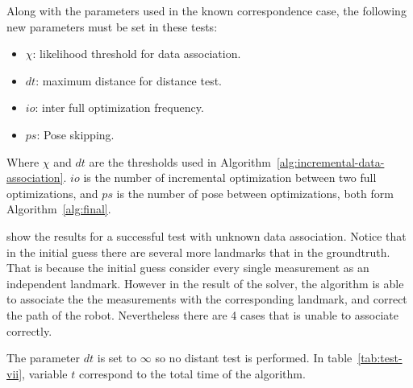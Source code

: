 Along with the parameters used in the known correspondence case, the following new parameters must be set in these tests:

\begin{itemize}
\item $\chi$: likelihood threshold for data association.
\item $dt$: maximum distance for distance test.
\item $io$: inter full optimization frequency.
\item $ps$: Pose skipping.
\end{itemize}

Where $\chi$ and $dt$ are the thresholds used in Algorithm~\ref{alg:incremental-data-association}. $io$ is the number of incremental optimization between two full optimizations, and $ps$ is the number of pose between optimizations, both form Algorithm~\ref{alg:final}.

 show the results for a successful test with unknown data association. Notice that in the initial guess there are several more landmarks that in the groundtruth. That is because the initial guess consider every single measurement as an independent landmark. However in the result of the solver, the algorithm is able to associate the the measurements with the corresponding landmark, and correct the path of the robot. Nevertheless there are 4 cases that is unable to associate correctly.

The parameter $dt$ is set to $\infty$ so no distant test is performed. In table~\ref{tab:test-vii}, variable $t$ correspond to the total time of the algorithm. 

